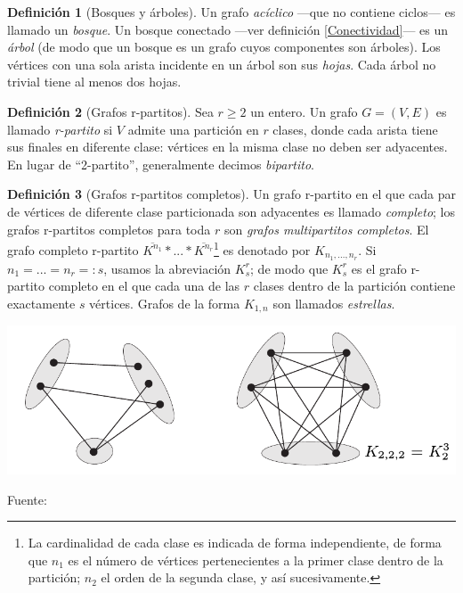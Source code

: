 \documentclass[letterpaper, 11pt]{book}
\theoremstyle{definition}
\newtheorem{definition}{Definición}[chapter]
\theoremstyle{remark}
\begin{document}
\begin{definition}[Bosques y árboles]
\label{BosquesArboles}
	Un grafo \emph{acíclico} ---que no contiene ciclos--- es llamado un \emph{bosque}. Un bosque conectado ---ver definición \ref{Conectividad}--- es un \emph{árbol} (de modo que un bosque es un grafo cuyos componentes son árboles). Los vértices con una sola arista incidente en un árbol son sus \emph{hojas}. Cada árbol no trivial tiene al menos dos hojas.
\end{definition}


\begin{definition}[Grafos r-partitos]
\label{R_partitos}
	Sea $r \geq 2$ un entero. Un grafo $G = (V,E) $ es llamado \emph{r-partito} si $V$ admite una partición en $r$ clases, donde cada arista tiene sus finales en diferente clase: vértices en la misma clase no deben ser adyacentes. En lugar de ``2-partito'', generalmente decimos \emph{bipartito}.
\end{definition}


\begin{definition}[Grafos r-partitos completos]
\label{R_partitosCompletos}
	Un grafo r-partito en el que cada par de vértices de diferente clase particionada son adyacentes es llamado \emph{completo}; los grafos r-partitos completos para toda $r$ son \emph{grafos multipartitos completos}. 
	El grafo completo r-partito $\overline{ K^{n_{1}} } *... * \overline{ K^{n_{r}} }$\footnote{
	    La cardinalidad de cada clase es indicada de forma independiente, de forma que $n_{1}$ es el número de vértices pertenecientes a la primer clase dentro de la partición; $n_{2}$ el orden de la segunda clase, y así sucesivamente.
	} es denotado por $K_{n_{1},...,n_{r}}$. 
	Si $n_{1}=...=n_{r}=:s$, usamos la abreviación $K_{s}^{r}$; de modo que $K_{s}^{r}$ es el grafo r-partito completo en el que cada una de las $r$ clases dentro de la partición contiene exactamente $s$ vértices. 
	Grafos de la forma $K_{1,n}$ son llamados \emph{estrellas}.
\end{definition}

\begin{minipage}{\linewidth}
\centering
{} \label{1.3_Grafos_3partitos}
\includegraphics[scale=.3]{img/1.3_Grafos_3partitos.png}
\par\bigskip
\small Fuente: \citep[15]{2005_Diestel_GraphThery}
\end{minipage}\bigskip
\end{document}
